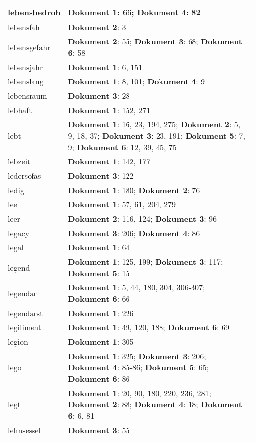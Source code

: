 \documentclass[a5paper]{article}
\begin{document}
\begin{longtable}[l]{|l|p{3in}|}
\hline
lebensbedroh & \textbf{Dokument 1}: 66; \textbf{Dokument 4}: 82 \\
\hline
lebensfah & \textbf{Dokument 2}: 3 \\
\hline
lebensgefahr & \textbf{Dokument 2}: 55; \textbf{Dokument 3}: 68; \textbf{Dokument 6}: 58 \\
\hline
lebensjahr & \textbf{Dokument 1}: 6, 151 \\
\hline
lebenslang & \textbf{Dokument 1}: 8, 101; \textbf{Dokument 4}: 9 \\
\hline
lebensraum & \textbf{Dokument 3}: 28 \\
\hline
lebhaft & \textbf{Dokument 1}: 152, 271 \\
\hline
lebt & \textbf{Dokument 1}: 16, 23, 194, 275; \textbf{Dokument 2}: 5, 9, 18, 37; \textbf{Dokument 3}: 23, 191; \textbf{Dokument 5}: 7, 9; \textbf{Dokument 6}: 12, 39, 45, 75 \\
\hline
lebzeit & \textbf{Dokument 1}: 142, 177 \\
\hline
ledersofas & \textbf{Dokument 3}: 122 \\
\hline
ledig & \textbf{Dokument 1}: 180; \textbf{Dokument 2}: 76 \\
\hline
lee & \textbf{Dokument 1}: 57, 61, 204, 279 \\
\hline
leer & \textbf{Dokument 2}: 116, 124; \textbf{Dokument 3}: 96 \\
\hline
legacy & \textbf{Dokument 3}: 206; \textbf{Dokument 4}: 86 \\
\hline
legal & \textbf{Dokument 1}: 64 \\
\hline
legend & \textbf{Dokument 1}: 125, 199; \textbf{Dokument 3}: 117; \textbf{Dokument 5}: 15 \\
\hline
legendar & \textbf{Dokument 1}: 5, 44, 180, 304, 306-307; \textbf{Dokument 6}: 66 \\
\hline
legendarst & \textbf{Dokument 1}: 226 \\
\hline
legiliment & \textbf{Dokument 1}: 49, 120, 188; \textbf{Dokument 6}: 69 \\
\hline
legion & \textbf{Dokument 1}: 305 \\
\hline
lego & \textbf{Dokument 1}: 325; \textbf{Dokument 3}: 206; \textbf{Dokument 4}: 85-86; \textbf{Dokument 5}: 65; \textbf{Dokument 6}: 86 \\
\hline
legt & \textbf{Dokument 1}: 20, 90, 180, 220, 236, 281; \textbf{Dokument 2}: 88; \textbf{Dokument 4}: 18; \textbf{Dokument 6}: 6, 81 \\
\hline
lehnsessel & \textbf{Dokument 3}: 55 \\

\end{longtable}
\end{document}
